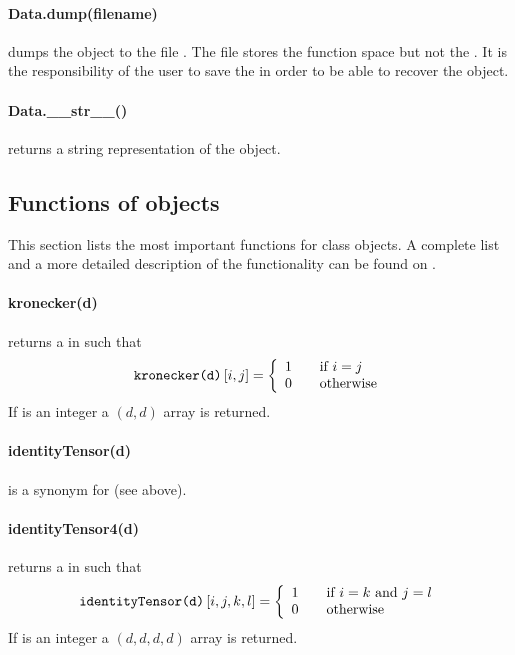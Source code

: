 \paragraph{Data.dump(filename)}
dumps the \Data object to the file . The file stores the
function space but not the \Domain. It is the responsibility of the user to
save the \Domain in order to be able to recover the \Data object.


\paragraph{Data.__str__()}
returns a string representation of the object.


\subsection{Functions of \Data objects}
This section lists the most important functions for \Data class objects.
A complete list and a more detailed description of the functionality can be
found on \ReferenceGuide.

\paragraph{kronecker(d)}
returns a \RankTwo in \FunctionSpace {} such that
\begin{equation}
\code{kronecker(d)}\left[ i,j\right] = \left\{
\begin{array}{l l}
    1 & \quad \text{if $i=j$}\\
    0 & \quad \text{otherwise}
\end{array}
\right.
\end{equation}
If  is an integer a $(d,d)$ \numpy array is returned.


\paragraph{identityTensor(d)}
is a synonym for  (see above).


\paragraph{identityTensor4(d)}
returns a \RankFour in \FunctionSpace {} such that
\begin{equation}
\code{identityTensor(d)}\left[ i,j,k,l\right] = \left\{
\begin{array}{l l}
    1 & \quad \text{if $i=k$ and $j=l$}\\
    0 & \quad \text{otherwise}
\end{array}
\right.
\end{equation}
If  is an integer a $(d,d,d,d)$ \numpy array is returned.


